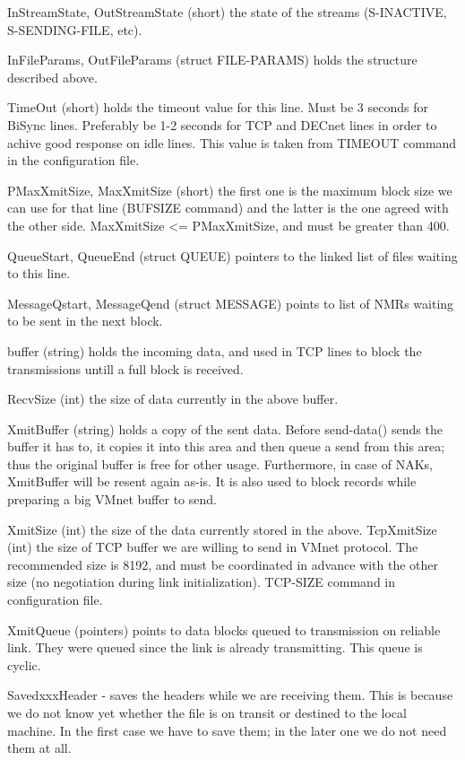 InStreamState,   OutStreamState   (short)   the  state  of  the  streams
(S-INACTIVE, S-SENDING-FILE, etc).

InFileParams, OutFileParams (struct  FILE-PARAMS)  holds  the  structure
described above.

TimeOut (short) holds the timeout value for this line. Must be 3 seconds
for BiSync lines. Preferably be 1-2 seconds for TCP and DECnet lines  in
order  to  achive  good response on idle lines. This value is taken from
TIMEOUT command in the configuration file.

PMaxXmitSize, MaxXmitSize (short) the first one  is  the  maximum  block
size  we  can  use for that line (BUFSIZE command) and the latter is the
one agreed with the other side. MaxXmitSize <= PMaxXmitSize, and must be
greater than 400.

QueueStart, QueueEnd (struct QUEUE) pointers to the linked list of files
waiting to this line.

MessageQstart, MessageQend (struct  MESSAGE)  points  to  list  of  NMRs
waiting to be sent in the next block.

buffer  (string) holds the incoming data, and used in TCP lines to block
the transmissions untill a full block is received.

RecvSize (int) the size of data currently in the above buffer.

XmitBuffer (string) holds a copy of the sent  data.  Before  send-data()
sends the buffer it has to, it copies it into this area and then queue a
send from this area; thus the original buffer is free for  other  usage.
Furthermore,  in case of NAKs, XmitBuffer will be resent again as-is. It
is also used to block records while preparing  a  big  VMnet  buffer  to
send.

XmitSize (int) the size of the data currently stored in the above.
TcpXmitSize (int) the size of TCP buffer we are willing to send in VMnet
protocol. The recommended size is  8192,  and  must  be  coordinated  in
advance with the other size (no negotiation during link initialization).
TCP-SIZE command in configuration file.

XmitQueue (pointers) points to data blocks  queued  to  transmission  on
reliable  link. They were queued since the link is already transmitting.
This queue is cyclic.

SavedxxxHeader - saves the headers while we are receiving them. This  is
because we do not know yet whether the file is on transit or destined to
the local machine. In the first case we have to save them; in the  later
one we do not need them at all.

